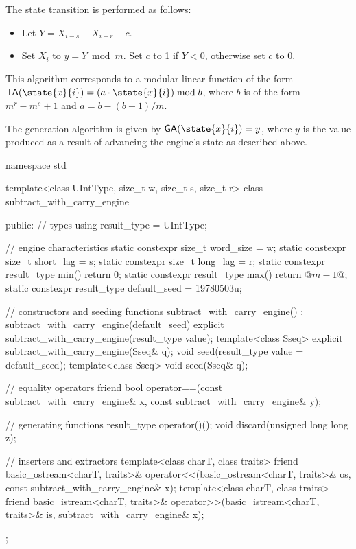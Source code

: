 \pnum
The state transition
is performed as follows:
\begin{itemize}
 \item
   Let $Y = X_{i-s} - X_{i-r} - c$.
 \item
   Set $X_i$ to $y = Y \bmod m$.
   Set $c$ to 1 if $Y < 0$,
   otherwise set $c$ to 0.
\end{itemize}
\begin{note}
 This algorithm corresponds
 to a modular linear function
 of the form
 $\mathsf{TA}(\state{x}{i}) = (a \cdot \state{x}{i}) \bmod b$,
 where $b$ is of the form
 $m^r - m^s + 1$
 and $a = b - (b - 1) / m$.
\end{note}

\pnum
The generation algorithm
is given by $\mathsf{GA}(\state{x}{i}) = y$,
where $y$ is the value produced as a result
of advancing the engine's state as described above.

%
%
\begin{codeblock}
namespace std {
  template<class UIntType, size_t w, size_t s, size_t r>
  class subtract_with_carry_engine {
  public:
    // types
    using result_type = UIntType;

    // engine characteristics
    static constexpr size_t word_size = w;
    static constexpr size_t short_lag = s;
    static constexpr size_t long_lag = r;
    static constexpr result_type min() { return 0; }
    static constexpr result_type max() { return @$m - 1$@; }
    static constexpr result_type default_seed = 19780503u;

    // constructors and seeding functions
    subtract_with_carry_engine() : subtract_with_carry_engine(default_seed) {}
    explicit subtract_with_carry_engine(result_type value);
    template<class Sseq> explicit subtract_with_carry_engine(Sseq& q);
    void seed(result_type value = default_seed);
    template<class Sseq> void seed(Sseq& q);

    // equality operators
    friend bool operator==(const subtract_with_carry_engine& x,
                           const subtract_with_carry_engine& y);

    // generating functions
    result_type operator()();
    void discard(unsigned long long z);

    // inserters and extractors
    template<class charT, class traits>
      friend basic_ostream<charT, traits>&
        operator<<(basic_ostream<charT, traits>& os, const subtract_with_carry_engine& x);
    template<class charT, class traits>
      friend basic_istream<charT, traits>&
        operator>>(basic_istream<charT, traits>& is, subtract_with_carry_engine& x);
  };
}
\end{codeblock}

